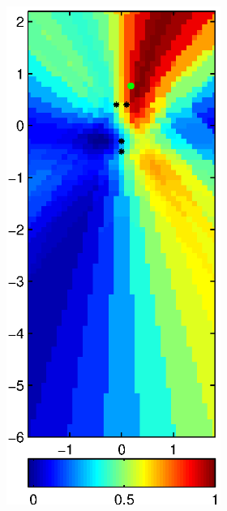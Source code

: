 \documentclass[spanish,openright]{book}
\begin{document}
\begin{figure}
\begin{subfigure}[t]{0.47\textwidth}
\begin{minipage}[t]{\textwidth}
\begin{subfigure}[t]{0.3\textwidth}
\label{fig:Pattern_Fo1500_pos16}
\end{subfigure}
\begin{subfigure}[t]{0.3\textwidth}
\includegraphics[width=\textwidth]{SRP_Fo1500_frame2518_pos16}

\end{subfigure}
\end{minipage}
\end{subfigure}
\end{figure}
\end{document}
